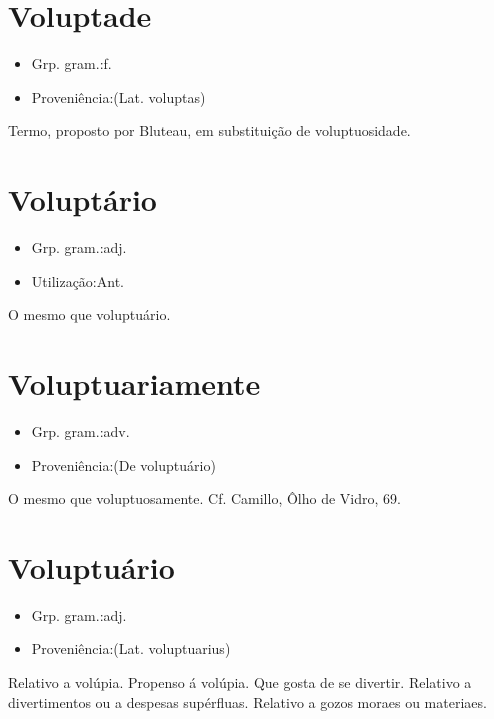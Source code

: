 \documentclass{article}
\begin{document}
\section{Voluptade}
\begin{itemize}
\item {Grp. gram.:f.}
\end{itemize}
\begin{itemize}
\item {Proveniência:(Lat. \textunderscore voluptas\textunderscore )}
\end{itemize}
Termo, proposto por Bluteau, em substituição de \textunderscore voluptuosidade\textunderscore .
\section{Voluptário}
\begin{itemize}
\item {Grp. gram.:adj.}
\end{itemize}
\begin{itemize}
\item {Utilização:Ant.}
\end{itemize}
O mesmo que \textunderscore voluptuário\textunderscore .
\section{Voluptuariamente}
\begin{itemize}
\item {Grp. gram.:adv.}
\end{itemize}
\begin{itemize}
\item {Proveniência:(De \textunderscore voluptuário\textunderscore )}
\end{itemize}
O mesmo que \textunderscore voluptuosamente\textunderscore . Cf. Camillo, \textunderscore Ôlho de Vidro\textunderscore , 69.
\section{Voluptuário}
\begin{itemize}
\item {Grp. gram.:adj.}
\end{itemize}
\begin{itemize}
\item {Proveniência:(Lat. \textunderscore voluptuarius\textunderscore )}
\end{itemize}
Relativo a volúpia.
Propenso á volúpia.
Que gosta de se divertir.
Relativo a divertimentos ou a despesas supérfluas.
Relativo a gozos moraes ou materiaes.
\end{document}
